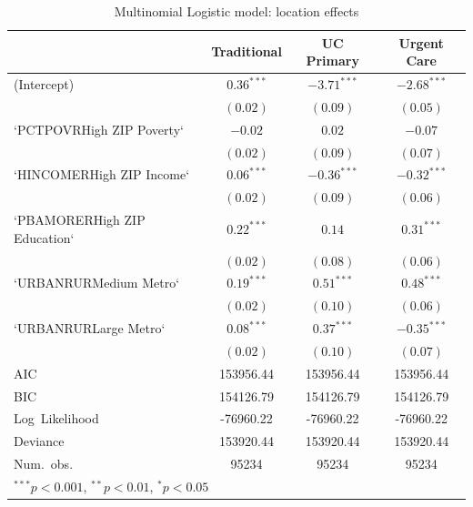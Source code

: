 \documentclass[12pt,twoside]{reedthesis}
\begin{document}
  \begin{table}
  \caption{Multinomial Logistic model: location effects}
  \begin{center}
  \begin{footnotesize}
  \begin{tabular}{l c c c }
  \hline
   & Traditional & UC Primary & Urgent Care \\
  \hline
  (Intercept)                  & $\mathbf{0.36}^{***}$ & $\mathbf{-3.71}^{***}$ & $\mathbf{-2.68}^{***}$ \\
                               & $(0.02)$              & $(0.09)$               & $(0.05)$               \\
  `PCTPOVRHigh ZIP Poverty`    & $-0.02$               & $0.02$                 & $-0.07$                \\
                               & $(0.02)$              & $(0.09)$               & $(0.07)$               \\
  `HINCOMERHigh ZIP Income`    & $\mathbf{0.06}^{***}$ & $\mathbf{-0.36}^{***}$ & $\mathbf{-0.32}^{***}$ \\
                               & $(0.02)$              & $(0.09)$               & $(0.06)$               \\
  `PBAMORERHigh ZIP Education` & $\mathbf{0.22}^{***}$ & $0.14$                 & $\mathbf{0.31}^{***}$  \\
                               & $(0.02)$              & $(0.08)$               & $(0.06)$               \\
  `URBANRURMedium Metro`       & $\mathbf{0.19}^{***}$ & $\mathbf{0.51}^{***}$  & $\mathbf{0.48}^{***}$  \\
                               & $(0.02)$              & $(0.10)$               & $(0.06)$               \\
  `URBANRURLarge Metro`        & $\mathbf{0.08}^{***}$ & $\mathbf{0.37}^{***}$  & $\mathbf{-0.35}^{***}$ \\
                               & $(0.02)$              & $(0.10)$               & $(0.07)$               \\
  \hline
  AIC                          & 153956.44             & 153956.44              & 153956.44              \\
  BIC                          & 154126.79             & 154126.79              & 154126.79              \\
  Log\ Likelihood              & -76960.22             & -76960.22              & -76960.22              \\
  Deviance                     & 153920.44             & 153920.44              & 153920.44              \\
  Num.\ obs.                   & 95234                 & 95234                  & 95234                  \\
  \hline
  \multicolumn{4}{l}{\tiny{$^{***}p<0.001$, $^{**}p<0.01$, $^*p<0.05$}}
  \end{tabular}
  \end{footnotesize}
  \label{table:coefficients}
  \end{center}
  \end{table}
  
\end{document}
